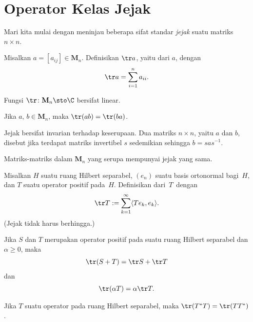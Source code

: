\section{Operator Kelas Jejak}

Mari kita mulai dengan meninjau beberapa sifat standar \emph{jejak} suatu matriks $n \times n$.

\begin{defn}\label{tr0113} Misalkan $a = [a_{ij}] \in \mathbf M_n$. Definisikan $\tr a$, yaitu
 dari $a$, dengan
  \[ \tr a = \sum_{i = 1}^n a_{ii}. \]
\end{defn}

\begin{prop}\label{tr0117} Fungsi $\tr\colon \mathbf M_n \sto \C$ bersifat linear.
\end{prop}

\begin{prop}\label{tr0121} Jika $a$, $b \in \mathbf M_n$, maka $\tr (ab) = \tr (ba)$.
\end{prop}

Jejak bersifat invarian terhadap keserupaan. Dua matriks $n \times n$, yaitu $a$ dan $b$, disebut
 jika terdapat matriks invertibel $s$ sedemikian sehingga $b = sas^{-1}$.

\begin{prop}\label{tr0124} Matriks-matriks dalam $\mathbf M_n$ yang serupa mempunyai jejak yang sama.
\end{prop}

\begin{defn}\label{tr0211} Misalkan $H$ suatu ruang Hilbert separabel, $(e_n)$ suatu basis ortonormal bagi~$H$, dan $T$
suatu operator positif pada~$H$. Definisikan
 dari~$T$~dengan
    \[ \tr T:=\sum_{k=1}^\infty \langle Te_k,e_k \rangle. \]
(Jejak tidak harus berhingga.)
\end{defn}

\begin{prop} Jika $S$ dan $T$ merupakan operator positif pada suatu ruang Hilbert separabel dan $\alpha \ge 0$, maka
   \[  \tr(S + T) = \tr S + \tr T \]
dan
   \[ \tr(\alpha T) = \alpha \tr T. \]
\end{prop}

\begin{prop} Jika $T$ suatu operator pada ruang Hilbert separabel, maka $\tr(T^*T) = \tr(TT^*)$.
\end{prop}

